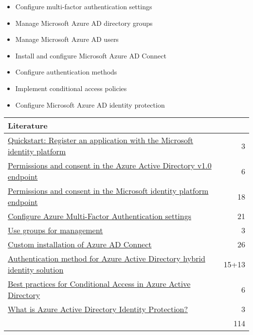 \begin{itemize}
\item Configure multi-factor authentication settings 
\item Manage Microsoft Azure AD directory groups 
\item Manage Microsoft Azure AD users 
\item Install and configure Microsoft Azure AD Connect 
\item Configure authentication methods 
\item Implement conditional access policies 
\item Configure Microsoft Azure AD identity protection 
\end{itemize}

\begin{tabular}{p{14cm} | r}
\textbf{Literature} & \\
\hline
\href{https://docs.microsoft.com/en-us/azure/active-directory/develop/quickstart-register-app}{Quickstart: Register an application with the Microsoft identity platform} & 3 \\
\href{https://docs.microsoft.com/en-us/azure/active-directory/develop/v1-permissions-and-consent}{Permissions and consent in the Azure Active Directory v1.0 endpoint} & 6 \\
\href{https://docs.microsoft.com/en-us/azure/active-directory/develop/v2-permissions-and-consent}{Permissions and consent in the Microsoft identity platform endpoint} & 18 \\
\href{https://docs.microsoft.com/en-us/azure/active-directory/authentication/howto-mfa-mfasettings}{Configure Azure Multi-Factor Authentication settings} & 21 \\
\href{https://docs.microsoft.com/en-us/microsoft-365/enterprise/identity-use-group-management}{Use groups for management} & 3 \\
\href{https://docs.microsoft.com/en-us/azure/active-directory/hybrid/how-to-connect-install-custom}{Custom installation of Azure AD Connect} & 26 \\
\href{https://docs.microsoft.com/en-us/azure/security/fundamentals/choose-ad-authn}{Authentication method for Azure Active Directory hybrid identity solution} & 15+13 \\
\href{https://docs.microsoft.com/en-us/azure/active-directory/conditional-access/best-practices}{Best practices for Conditional Access in Azure Active Directory} & 6 \\
\href{https://docs.microsoft.com/en-us/azure/active-directory/identity-protection/overview-identity-protection}{What is Azure Active Directory Identity Protection?} & 3 \\
\cline{2-2} 
 & 114
\end{tabular}

